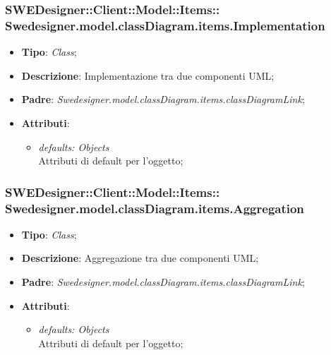 \documentclass[../DefinizioneDiProdotto.tex]{subfiles}
\begin{document}
			\subsubsection[Swedesigner.model.classDiagram.items.Implementation]{SWEDesigner::Client::Model::Items::\\Swedesigner.model.classDiagram.items.Implementation}
			\hypertarget{SWEDesigner::Client::Model::Items::Swedesigner.model.classDiagram.items.Implementation}{}
			\begin{itemize}
				\item \textbf{Tipo}: \emph{Class};
				\item \textbf{Descrizione}: Implementazione tra due componenti UML;
				\item \textbf{Padre}: \emph{Swedesigner.model.classDiagram.items.classDiagramLink};
				\item \textbf{Attributi}:
				\begin{itemize}
					\item \emph{defaults: Objects}\\
					Attributi di default per l'oggetto;
				\end{itemize}
			\end{itemize}
			\subsubsection[Swedesigner.model.classDiagram.items.Aggregation]{SWEDesigner::Client::Model::Items::\\Swedesigner.model.classDiagram.items.Aggregation}
			\hypertarget{SWEDesigner::Client::Model::Items::Swedesigner.model.classDiagram.items.Aggregation}{}
			\begin{itemize}
				\item \textbf{Tipo}: \emph{Class};
				\item \textbf{Descrizione}: Aggregazione tra due componenti UML;
				\item \textbf{Padre}: \emph{Swedesigner.model.classDiagram.items.classDiagramLink};
				\item \textbf{Attributi}:
				\begin{itemize}
					\item \emph{defaults: Objects}\\
					Attributi di default per l'oggetto;
				\end{itemize}
			\end{itemize}
\end{document}
